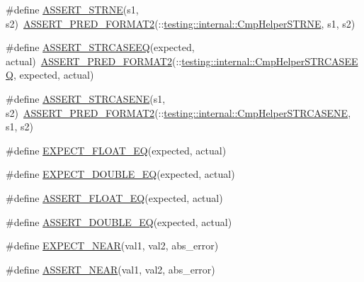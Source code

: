 \begin{DoxyCompactItemize}
\item 
\#define \hyperlink{fused-src_2gtest_2gtest_8h_a3d679660ac1b2f9f6e6c7608452af923}{A\-S\-S\-E\-R\-T\-\_\-\-S\-T\-R\-N\-E}(s1, s2)~\hyperlink{gtest__pred__impl_8h_ac452685a1a98ea3d96eb956a062ee210}{A\-S\-S\-E\-R\-T\-\_\-\-P\-R\-E\-D\-\_\-\-F\-O\-R\-M\-A\-T2}(\-::\hyperlink{namespacetesting_1_1internal_af2d31c77ce73e1003a64bd7ca3564bbe}{testing\-::internal\-::\-Cmp\-Helper\-S\-T\-R\-N\-E}, s1, s2)
\item 
\#define \hyperlink{fused-src_2gtest_2gtest_8h_ad140c8b1f79ae534781784e580ab21a6}{A\-S\-S\-E\-R\-T\-\_\-\-S\-T\-R\-C\-A\-S\-E\-E\-Q}(expected, actual)~\hyperlink{gtest__pred__impl_8h_ac452685a1a98ea3d96eb956a062ee210}{A\-S\-S\-E\-R\-T\-\_\-\-P\-R\-E\-D\-\_\-\-F\-O\-R\-M\-A\-T2}(\-::\hyperlink{namespacetesting_1_1internal_a802d9586d870a90e6a850953c167654d}{testing\-::internal\-::\-Cmp\-Helper\-S\-T\-R\-C\-A\-S\-E\-E\-Q}, expected, actual)
\item 
\#define \hyperlink{fused-src_2gtest_2gtest_8h_ac3d2c3836b103068a050f32585b2aaad}{A\-S\-S\-E\-R\-T\-\_\-\-S\-T\-R\-C\-A\-S\-E\-N\-E}(s1, s2)~\hyperlink{gtest__pred__impl_8h_ac452685a1a98ea3d96eb956a062ee210}{A\-S\-S\-E\-R\-T\-\_\-\-P\-R\-E\-D\-\_\-\-F\-O\-R\-M\-A\-T2}(\-::\hyperlink{namespacetesting_1_1internal_a7e31d489f06ab8f6a81a7729f0c377e7}{testing\-::internal\-::\-Cmp\-Helper\-S\-T\-R\-C\-A\-S\-E\-N\-E}, s1, s2)
\item 
\#define \hyperlink{fused-src_2gtest_2gtest_8h_a5ce7d58df8cb696aa05e77c2370de7a8}{E\-X\-P\-E\-C\-T\-\_\-\-F\-L\-O\-A\-T\-\_\-\-E\-Q}(expected, actual)
\item 
\#define \hyperlink{fused-src_2gtest_2gtest_8h_a6e6277442d96cd18300619c321614397}{E\-X\-P\-E\-C\-T\-\_\-\-D\-O\-U\-B\-L\-E\-\_\-\-E\-Q}(expected, actual)
\item 
\#define \hyperlink{fused-src_2gtest_2gtest_8h_a965b7b85a1c2d26981a1dfa48f67ebda}{A\-S\-S\-E\-R\-T\-\_\-\-F\-L\-O\-A\-T\-\_\-\-E\-Q}(expected, actual)
\item 
\#define \hyperlink{fused-src_2gtest_2gtest_8h_a360ed28a372738adca9ac2fa9522e562}{A\-S\-S\-E\-R\-T\-\_\-\-D\-O\-U\-B\-L\-E\-\_\-\-E\-Q}(expected, actual)
\item 
\#define \hyperlink{fused-src_2gtest_2gtest_8h_a88cd7978af0e7dbd42cd606dfabdcc6f}{E\-X\-P\-E\-C\-T\-\_\-\-N\-E\-A\-R}(val1, val2, abs\-\_\-error)
\item 
\#define \hyperlink{fused-src_2gtest_2gtest_8h_a73cce6b752d204f91a36bef2f8e663b3}{A\-S\-S\-E\-R\-T\-\_\-\-N\-E\-A\-R}(val1, val2, abs\-\_\-error)
\item 

\end{DoxyCompactItemize}
